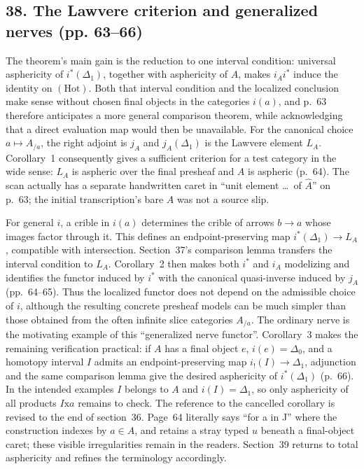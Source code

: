 \subsection*{38. The Lawvere criterion and generalized nerves (pp. 63--66)}
The theorem's main gain is the reduction to one interval condition: universal asphericity of $i^*(\Delta_1)$, together with asphericity of $A$, makes $i_Ai^*$ induce the identity on $(\mathrm{Hot})$. Both that interval condition and the localized conclusion make sense without chosen final objects in the categories $i(a)$, and p.~63 therefore anticipates a more general comparison theorem, while acknowledging that a direct evaluation map would then be unavailable. For the canonical choice $a\mapsto A_{/a}$, the right adjoint is $j_A$ and $j_A(\Delta_1)$ is the Lawvere element $L_A$. Corollary~1 consequently gives a sufficient criterion for a test category in the wide sense: $L_A$ is aspheric over the final presheaf and $A$ is aspheric (p.~64). The scan actually has a separate handwritten caret in ``unit element \ldots\ of $\widehat A$'' on p.~63; the initial transcription's bare $A$ was not a source slip.

For general $i$, a crible in $i(a)$ determines the crible of arrows $b\to a$ whose images factor through it. This defines an endpoint-preserving map $i^*(\Delta_1)\to L_A$, compatible with intersection. Section~37's comparison lemma transfers the interval condition to $L_A$. Corollary~2 then makes both $i^*$ and $i_A$ modelizing and identifies the functor induced by $i^*$ with the canonical quasi-inverse induced by $j_A$ (pp.~64--65). Thus the localized functor does not depend on the admissible choice of $i$, although the resulting concrete presheaf models can be much simpler than those obtained from the often infinite slice categories $A_{/a}$. The ordinary nerve is the motivating example of this ``generalized nerve functor''. Corollary~3 makes the remaining verification practical: if $A$ has a final object $e$, $i(e)=\Delta_0$, and a homotopy interval $I$ admits an endpoint-preserving map $i_!(I)\to\Delta_1$, adjunction and the same comparison lemma give the desired asphericity of $i^*(\Delta_1)$ (p.~66). In the intended examples $I$ belongs to $A$ and $i(I)=\Delta_1$, so only asphericity of all products $I\mathrm{x}a$ remains to check. The reference to the cancelled corollary is revised to the end of section~36. Page~64 literally says ``for a in J'' where the construction indexes by $a\in A$, and retains a stray typed $u$ beneath a final-object caret; these visible irregularities remain in the readers. Section~39 returns to total asphericity and refines the terminology accordingly.
